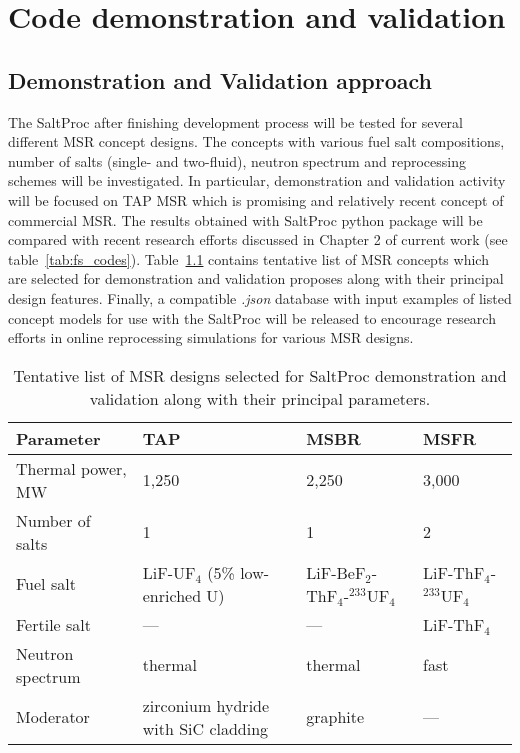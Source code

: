 \chapter[Code demonstration and validation]{Code demonstration and validation}

\section{Demonstration and Validation approach}
The SaltProc after finishing development process will be tested for several 
different \gls{MSR} concept designs. The concepts with various fuel salt 
compositions, number of salts (single- and two-fluid), neutron spectrum and 
reprocessing schemes will be investigated. In particular, demonstration 
and validation activity will be focused on \gls{TAP} \gls{MSR} which is 
promising and relatively recent concept of commercial \gls{MSR}. The results 
obtained with SaltProc python package will be compared with recent research 
efforts 
discussed in Chapter 2 of current work (see table~\ref{tab:fs_codes}). 
Table~\ref{tab:msr_concepts} 
contains tentative list of \gls{MSR} concepts which are selected for 
demonstration and validation proposes along with their principal design features. 
Finally, a compatible \textit{.json} database with input examples of listed 
concept models for use with the SaltProc will be released to encourage 
research efforts in online reprocessing simulations for various 
\gls{MSR} designs.
\begin{table}[!htb]
  \centering
  \caption{Tentative list of \gls{MSR} designs selected for SaltProc 
  demonstration and validation along with their principal parameters.}
  \label{tab:msr_concepts} 
  \begin{tabular}{p{} p{} p{} p{} } \toprule 
   Parameter & \gls{TAP} & \gls{MSBR} & \gls{MSFR}  \\ \midrule
   Thermal power, MW	&  1,250   & 2,250     & 3,000     \\ 
   Number of salts      & 1 		& 1 		& 2  		\\ 
   Fuel salt 			& LiF-UF$_4$ \newline (5\% low-enriched U) & LiF-BeF$_2$-ThF$_4$-$^{233}$UF$_4$ & 
   LiF-ThF$_4$-$^{233}$UF$_4$  \\
   Fertile salt 		& --- & --- &   LiF-ThF$_4$  \\
   Neutron spectrum     & thermal  & thermal & fast \\
   Moderator            & zirconium hydride with SiC cladding  & graphite & --- \\
     \bottomrule 
   \end{tabular}
\end{table}

